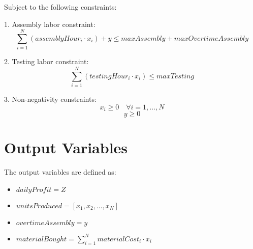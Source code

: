 \documentclass{article}
\begin{document}
Subject to the following constraints:

1. Assembly labor constraint:
\[
\sum_{i=1}^{N} (assemblyHour_i \cdot x_i) + y \leq maxAssembly + maxOvertimeAssembly
\]

2. Testing labor constraint:
\[
\sum_{i=1}^{N} (testingHour_i \cdot x_i) \leq maxTesting
\]

3. Non-negativity constraints:
\[
x_i \geq 0 \quad \forall i = 1, \ldots, N
\]
\[
y \geq 0
\]

\section*{Output Variables}
The output variables are defined as:
\begin{itemize}
    \item \( dailyProfit = Z \)
    \item \( unitsProduced = [x_1, x_2, \ldots, x_N] \)
    \item \( overtimeAssembly = y \)
    \item \( materialBought = \sum_{i=1}^{N} materialCost_i \cdot x_i \)
\end{itemize}
\end{document}
